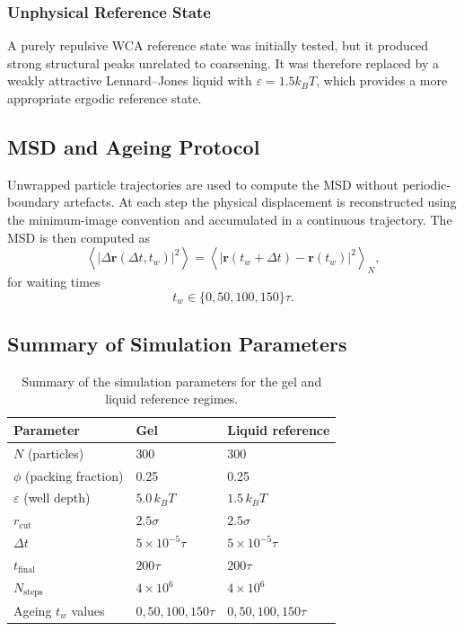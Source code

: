 \documentclass[11pt,a4paper]{article}
\begin{document}
\subsubsection{Unphysical Reference State}

A purely repulsive WCA reference state was initially tested, but it produced strong structural peaks unrelated to coarsening. It was therefore replaced by a weakly attractive Lennard--Jones liquid with $\varepsilon=1.5k_BT$, which provides a more appropriate ergodic reference state.

\subsection{MSD and Ageing Protocol}

Unwrapped particle trajectories are used to compute the MSD without periodic-boundary artefacts. At each step the physical displacement is reconstructed using the minimum-image convention and accumulated in a continuous trajectory. The MSD is then computed as
\begin{equation}
    \left\langle
    |\Delta\mathbf r(\Delta t,t_w)|^2
    \right\rangle
    =
    \left\langle
    \left|
    \mathbf r(t_w+\Delta t)-\mathbf r(t_w)
    \right|^2
    \right\rangle_N,
\end{equation}
for waiting times
\begin{equation}
    t_w \in \{0,50,100,150\}\tau.
\end{equation}

\subsection{Summary of Simulation Parameters}

\begin{table}[H]
\centering
\caption{Summary of the simulation parameters for the gel and liquid reference regimes.}
\label{tab:parameters}
\begin{tabular}{lll}
\toprule
Parameter & Gel & Liquid reference \\
\midrule
$N$ (particles) & 300 & 300 \\
$\phi$ (packing fraction) & 0.25 & 0.25 \\
$\varepsilon$ (well depth) & $5.0\,k_B T$ & $1.5\,k_B T$ \\
$r_{\mathrm{cut}}$ & $2.5\sigma$ & $2.5\sigma$ \\
$\Delta t$ & $5\times10^{-5}\tau$ & $5\times10^{-5}\tau$ \\
$t_{\mathrm{final}}$ & $200\tau$ & $200\tau$ \\
$N_{\mathrm{steps}}$ & $4\times10^6$ & $4\times10^6$ \\
Ageing $t_w$ values & $0,50,100,150\tau$ & $0,50,100,150\tau$ \\
\bottomrule
\end{tabular}
\end{table}
\end{document}
